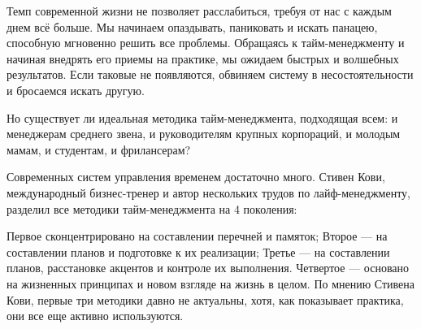 \label{sec:intro}

Темп современной жизни не позволяет расслабиться, требуя от нас с каждым днем всё больше. Мы начинаем опаздывать, паниковать и искать панацею, способную мгновенно решить все проблемы. Обращаясь к тайм-менеджменту и начиная внедрять его приемы на практике, мы ожидаем быстрых и волшебных результатов. Если таковые не появляются, обвиняем систему в несостоятельности и бросаемся искать другую.


Но существует ли идеальная методика тайм-менеджмента, подходящая всем: и менеджерам среднего звена, и руководителям крупных корпораций, и молодым мамам, и студентам, и фрилансерам?

Современных систем управления временем достаточно много. Стивен Кови, международный бизнес-тренер и автор нескольких трудов по лайф-менеджменту, разделил все методики тайм-менеджмента на 4 поколения:

Первое сконцентрировано на составлении перечней и памяток;
Второе — на составлении планов и подготовке к их реализации;
Третье — на составлении планов, расстановке акцентов и контроле их выполнения.
Четвертое — основано на жизненных принципах и новом взгляде на жизнь в целом.
По мнению Стивена Кови, первые три методики давно не актуальны, хотя, как показывает практика, они все еще активно используются.



